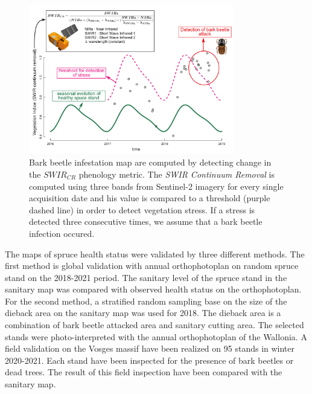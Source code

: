 \documentclass[3p,procedia]{elsarticle}
\begin{document}
\begin{figure}[htbp] 
	\centering
	\includegraphics[width=0.8\textwidth]{fctHarmo.png}
	\caption{Bark beetle infestation map are computed by detecting change in the $SWIR_{CR}$ phenology metric. The \textit{SWIR Continuum Removal} is computed using three bands from Sentinel-2 imagery for every single acquisition date and his value is compared to a threshold (purple dashed line) in order to detect vegetation stress. If a stress is detected three consecutive times, we assume that a bark beetle infection occured.}
	\label{fig:harmo}
\end{figure}


The maps of spruce health status were validated by three different methods.
The first method is global validation with annual orthophotoplan on random spruce stand on the 2018-2021 period. The sanitary level of the spruce stand in the sanitary map was compared with observed health status on the orthophotoplan.
For the second method, a stratified random sampling base on the size of the dieback area on the sanitary map was used for 2018.
The dieback area is a combination of bark beetle attacked area and sanitary cutting area. 
The selected stands were photo-interpreted with the annual orthophotoplan of the Wallonia.
A field validation on the Vosges massif have been realized on 95 stands in winter 2020-2021.
Each stand have been inspected for the presence of bark beetles or dead trees. 
The result of this field inspection have been compared with the sanitary map. 
\end{document}
